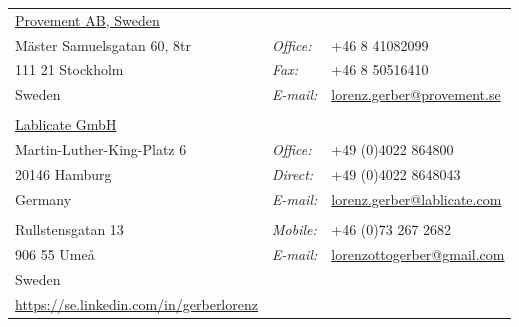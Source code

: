 \documentclass[10pt]{article}
\providecommand*\email[1]{\href{mailto:#1}{#1}}
\begin{document}
                                                                                           \begin{tabular}[t]{@{}p{\textwidth-\rcollength}p{0.5in}p{\rcollength}}
                                                                                             \href{http://www.provement.se/}{Provement AB, Sweden} & \\
                                                                                             M\"{a}ster Samuelsgatan 60, 8tr & \textit{Office:} & +46 8 41082099\\
                                                                                             111 21 Stockholm            & \textit{Fax:}    & +46 8 50516410\\
                                                                                             Sweden                      & \textit{E-mail:} & \email{lorenz.gerber@provement.se}\\
                                                                                             \\
                                                                                             \href{http://www.lablicate.com}{Lablicate GmbH}\\
                                                                                             Martin-Luther-King-Platz 6 & \textit{Office:} & +49 (0)4022 864800\\
                                                                                             20146 Hamburg              & \textit{Direct:} & +49 (0)4022 8648043\\
                                                                                             Germany                    & \textit{E-mail:} & \email{lorenz.gerber@lablicate.com}\\
                                                                                             \\
                                                                                             Rullstensgatan 13          & \textit{Mobile:} & +46 (0)73 267 2682 \\
                                                                                             906 55 Ume\aa              & \textit{E-mail:} & \email{lorenzottogerber@gmail.com} \\
                                                                                             Sweden\\
                                                                                             \href{https://se.linkedin.com/in/gerberlorenz}{https://se.linkedin.com/in/gerberlorenz}\\
                                                                                           \end{tabular}
\end{document}
